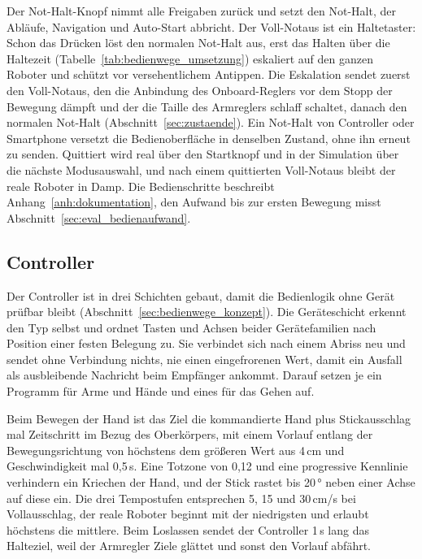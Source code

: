 Der Not-Halt-Knopf nimmt alle Freigaben zurück und setzt den Not-Halt, der Abläufe, Navigation und Auto-Start abbricht.
Der Voll-Notaus ist ein Haltetaster: Schon das Drücken löst den normalen Not-Halt aus, erst das Halten über die Haltezeit (Tabelle~\ref{tab:bedienwege_umsetzung}) eskaliert auf den ganzen Roboter und schützt vor versehentlichem Antippen.
Die Eskalation sendet zuerst den Voll-Notaus, den die Anbindung des Onboard-Reglers vor dem Stopp der Bewegung dämpft und der die Taille des Armreglers schlaff schaltet, danach den normalen Not-Halt (Abschnitt~\ref{sec:zustaende}).
Ein Not-Halt von Controller oder Smartphone versetzt die Bedienoberfläche in denselben Zustand, ohne ihn erneut zu senden.
Quittiert wird real über den Startknopf und in der Simulation über die nächste Modusauswahl, und nach einem quittierten Voll-Notaus bleibt der reale Roboter in Damp.
Die Bedienschritte beschreibt Anhang~\ref{anh:dokumentation}, den Aufwand bis zur ersten Bewegung misst Abschnitt~\ref{sec:eval_bedienaufwand}.

\subsection{Controller}
\label{sec:controller}
Der Controller ist in drei Schichten gebaut, damit die Bedienlogik ohne Gerät prüfbar bleibt (Abschnitt~\ref{sec:bedienwege_konzept}).
Die Geräteschicht erkennt den Typ selbst und ordnet Tasten und Achsen beider Gerätefamilien nach Position einer festen Belegung zu.
Sie verbindet sich nach einem Abriss neu und sendet ohne Verbindung nichts, nie einen eingefrorenen Wert, damit ein Ausfall als ausbleibende Nachricht beim Empfänger ankommt.
Darauf setzen je ein Programm für Arme und Hände und eines für das Gehen auf.

Beim Bewegen der Hand ist das Ziel die kommandierte Hand plus Stickausschlag mal Zeitschritt im Bezug des Oberkörpers, mit einem Vorlauf entlang der Bewegungsrichtung von höchstens dem größeren Wert aus 4\,cm und Geschwindigkeit mal 0,5\,s.
Eine Totzone von 0,12 und eine progressive Kennlinie verhindern ein Kriechen der Hand, und der Stick rastet bis 20\,° neben einer Achse auf diese ein.
Die drei Tempostufen entsprechen 5, 15 und 30\,cm/s bei Vollausschlag, der reale Roboter beginnt mit der niedrigsten und erlaubt höchstens die mittlere.
Beim Loslassen sendet der Controller 1\,s lang das Halteziel, weil der Armregler Ziele glättet und sonst den Vorlauf abfährt.

